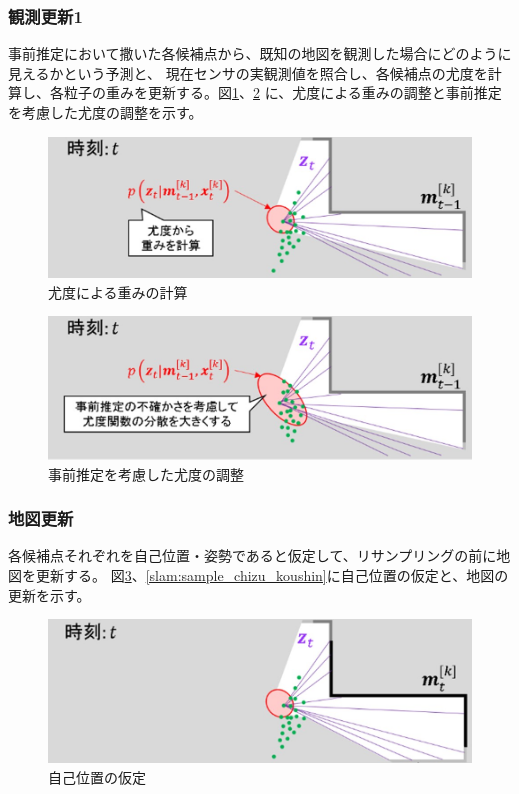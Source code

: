 \subsubsection{観測更新1}
事前推定において撒いた各候補点から、既知の地図を観測した場合にどのように見えるかという予測と、
現在センサの実観測値を照合し、各候補点の尤度を計算し、各粒子の重みを更新する。図\ref{slam:sample_omomi}、\ref{slam:sample_yuudo}
に、尤度による重みの調整と事前推定を考慮した尤度の調整を示す。

\begin{figure}[h]
  \begin{center}
  \includegraphics[width=.8\linewidth]{img/slam_14.jpg}
  \caption{尤度による重みの計算}
  \label{slam:sample_omomi}
  \end{center}
\end{figure}

\begin{figure}[h]
  \begin{center}
  \includegraphics[width=.8\linewidth]{img/slam_15.jpg}
  \caption{事前推定を考慮した尤度の調整}
  \label{slam:sample_yuudo}
  \end{center}
\end{figure}

\subsubsection{地図更新}
各候補点それぞれを自己位置・姿勢であると仮定して、リサンプリングの前に地図を更新する。
図\ref{slam:sample_jikoichi}、\ref{slam:sample_chizu_koushin}に自己位置の仮定と、地図の更新を示す。

\begin{figure}[h]
  \begin{center}
  \includegraphics[width=.8\linewidth]{img/slam_16.jpg}
  \caption{自己位置の仮定}
  \label{slam:sample_jikoichi}
  \end{center}
\end{figure}

